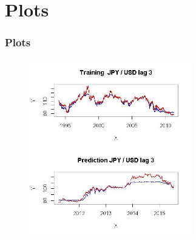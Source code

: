 \documentclass[12pt]{beamer}
\begin{document}
\section{Plots}
\begin{frame}
\frametitle{Plots}

\begin{figure}
  \centering
  \includegraphics[width=200pt]{picture.png}\\
\end{figure}
\


\end{frame}


	
	
\end{document}
